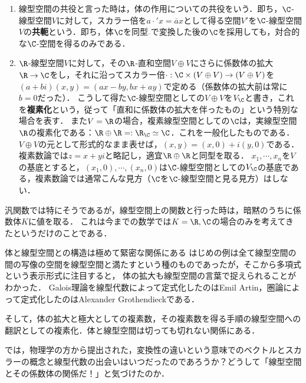 \documentclass[uplatex, dvipdfmx]{jsreport}
\begin{document}
\begin{example}\mbox{}\label{example-complexification}
    \begin{enumerate}
        \item 線型空間の共役と言った時は，体の作用についての共役をいう．即ち，$\C$-線型空間$V$に対して，スカラー倍を$a\cdot'x=\overline{a}x$として得る空間$V'$を$\C$-線型空間$V$の\textbf{共軛}という．即ち，体$\C$を同型$\overline{ }$で変換した後の$\C$を採用しても，対合的な$\C$-空間を得るのみである．
        \item $\R$-線型空間$V$に対して，その$\R$-直和空間$V\oplus V$にさらに係数体の拡大$\R\to\C$をし，それに沿ってスカラー倍$\cdot:\C\times(V\oplus V)\to (V\oplus V)$を$(a+bi)(x,y)=(ax-by,bx+ay)$で定める（係数体の拡大前は常に$b=0$だった）．
        こうして得た$\C$-線型空間としての$V\oplus V$を$V_\C$と書き，これを\textbf{複素化}という，従って「直和に係数体の拡大を伴ったもの」という特別な場合を表す．
        また$V=\R$の場合，複素線型空間としての$\C$は，実線型空間$\R$の複素化である：$\R\oplus\R=:\R_\C\simeq\C$．これを一般化したものである．
        $V\oplus V$の元として形式的なまま表せば，$(x,y)=(x,0)+i(y,0)$である．複素数論では$z=x+yi$と略記し，適宜$\R\oplus\R$と同型を取る．
        $x_1,\cdots,x_n$を$V$の基底とすると，$(x_1,0),\cdots,(x_n,0)$は$\C$-線型空間としての$V_\C$の基底である，複素数論では通常こんな見方（$\C$を$\C$-線型空間と見る見方）はしない．
    \end{enumerate}
\end{example}

\begin{remark}
    汎関数では特にそうであるが，線型空間上の関数と行った時は，暗黙のうちに係数体$K$に値を取る．
    これは今までの数学では$K=\R,\C$の場合のみを考えてきたというだけのことである．
\end{remark}

\begin{itembox}[l]{体と線型空間との構造は極めて緊密な関係にある}
    はじめの例は全て線型空間の間の写像の空間を線型空間と満たすという種のものであったが，そこから多項式という表示形式に注目すると，
    体の拡大も線型空間の言葉で捉えられることがわかった．
    Galois理論を線型代数によって定式化したのはEmil Artin，圏論によって定式化したのはAlexander Grothendieckである．

    そして，体の拡大と極大としての複素数，その複素数を得る手順の線型空間への翻訳としての複素化．体と線型空間は切っても切れない関係にある．

    では，物理学の方から提出された，変換性の違いという意味でのベクトルとスカラーの概念と線型代数の出会いはいつだったのであろうか？どうして「線型空間とその係数体の関係だ！」と気づけたのか．
\end{itembox}
\end{document}
